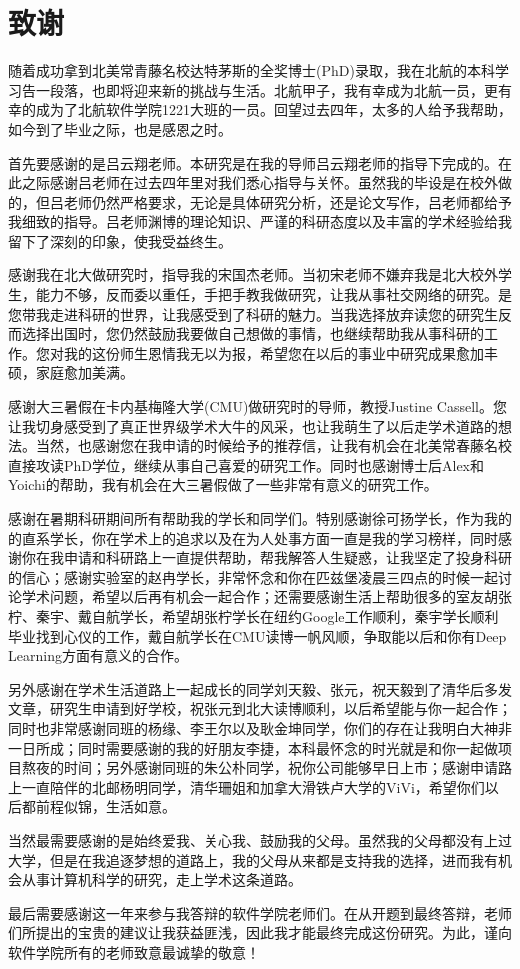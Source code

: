 \chapter*{致谢}

\qquad 随着成功拿到北美常青藤名校达特茅斯的全奖博士(PhD)录取，我在北航的本科学习告一段落，也即将迎来新的挑战与生活。北航甲子，我有幸成为北航一员，更有幸的成为了北航软件学院1221大班的一员。回望过去四年，太多的人给予我帮助，如今到了毕业之际，也是感恩之时。

首先要感谢的是吕云翔老师。本研究是在我的导师吕云翔老师的指导下完成的。在此之际感谢吕老师在过去四年里对我们悉心指导与关怀。虽然我的毕设是在校外做的，但吕老师仍然严格要求，无论是具体研究分析，还是论文写作，吕老师都给予我细致的指导。吕老师渊博的理论知识、严谨的科研态度以及丰富的学术经验给我留下了深刻的印象，使我受益终生。

感谢我在北大做研究时，指导我的宋国杰老师。当初宋老师不嫌弃我是北大校外学生，能力不够，反而委以重任，手把手教我做研究，让我从事社交网络的研究。是您带我走进科研的世界，让我感受到了科研的魅力。当我选择放弃读您的研究生反而选择出国时，您仍然鼓励我要做自己想做的事情，也继续帮助我从事科研的工作。您对我的这份师生恩情我无以为报，希望您在以后的事业中研究成果愈加丰硕，家庭愈加美满。

感谢大三暑假在卡内基梅隆大学(CMU)做研究时的导师，教授Justine Cassell。您让我切身感受到了真正世界级学术大牛的风采，也让我萌生了以后走学术道路的想法。当然，也感谢您在我申请的时候给予的推荐信，让我有机会在北美常春藤名校直接攻读PhD学位，继续从事自己喜爱的研究工作。同时也感谢博士后Alex和Yoichi的帮助，我有机会在大三暑假做了一些非常有意义的研究工作。

感谢在暑期科研期间所有帮助我的学长和同学们。特别感谢徐可扬学长，作为我的的直系学长，你在学术上的追求以及在为人处事方面一直是我的学习榜样，同时感谢你在我申请和科研路上一直提供帮助，帮我解答人生疑惑，让我坚定了投身科研的信心；感谢实验室的赵冉学长，非常怀念和你在匹兹堡凌晨三四点的时候一起讨论学术问题，希望以后再有机会一起合作；还需要感谢生活上帮助很多的室友胡张柠、秦宇、戴自航学长，希望胡张柠学长在纽约Google工作顺利，秦宇学长顺利毕业找到心仪的工作，戴自航学长在CMU读博一帆风顺，争取能以后和你有Deep Learning方面有意义的合作。


另外感谢在学术生活道路上一起成长的同学刘天毅、张元，祝天毅到了清华后多发文章，研究生申请到好学校，祝张元到北大读博顺利，以后希望能与你一起合作；同时也非常感谢同班的杨缘、李王尔以及耿金坤同学，你们的存在让我明白大神非一日所成；同时需要感谢的我的好朋友李捷，本科最怀念的时光就是和你一起做项目熬夜的时间；另外感谢同班的朱公朴同学，祝你公司能够早日上市；感谢申请路上一直陪伴的北邮杨明同学，清华珊姐和加拿大滑铁卢大学的ViVi，希望你们以后都前程似锦，生活如意。


当然最需要感谢的是始终爱我、关心我、鼓励我的父母。虽然我的父母都没有上过大学，但是在我追逐梦想的道路上，我的父母从来都是支持我的选择，进而我有机会从事计算机科学的研究，走上学术这条道路。


最后需要感谢这一年来参与我答辩的软件学院老师们。在从开题到最终答辩，老师们所提出的宝贵的建议让我获益匪浅，因此我才能最终完成这份研究。为此，谨向软件学院所有的老师致意最诚挚的敬意！


















\cleardoublepage
